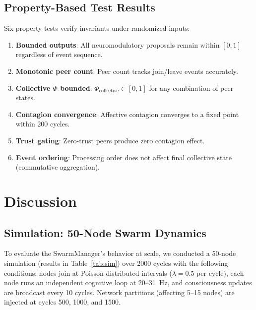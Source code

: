 \documentclass[11pt,a4paper]{article}
\begin{document}
\subsection{Property-Based Test Results}

Six property tests verify invariants under randomized inputs:

\begin{enumerate}
  \item \textbf{Bounded outputs}: All neuromodulatory proposals remain within $[0, 1]$ regardless of event sequence.
  \item \textbf{Monotonic peer count}: Peer count tracks join/leave events accurately.
  \item \textbf{Collective $\Phi$ bounded}: $\Phi_{\text{collective}} \in [0, 1]$ for any combination of peer states.
  \item \textbf{Contagion convergence}: Affective contagion converges to a fixed point within 200 cycles.
  \item \textbf{Trust gating}: Zero-trust peers produce zero contagion effect.
  \item \textbf{Event ordering}: Processing order does not affect final collective state (commutative aggregation).
\end{enumerate}

\section{Discussion}

\subsection{Simulation: 50-Node Swarm Dynamics}

To evaluate the SwarmManager's behavior at scale, we conducted a 50-node simulation (results in Table~\ref{tab:sim}) over 2000 cycles with the following conditions: nodes join at Poisson-distributed intervals ($\lambda = 0.5$ per cycle), each node runs an independent cognitive loop at 20--31~Hz, and consciousness updates are broadcast every 10 cycles. Network partitions (affecting 5--15 nodes) are injected at cycles 500, 1000, and 1500.
\end{document}
